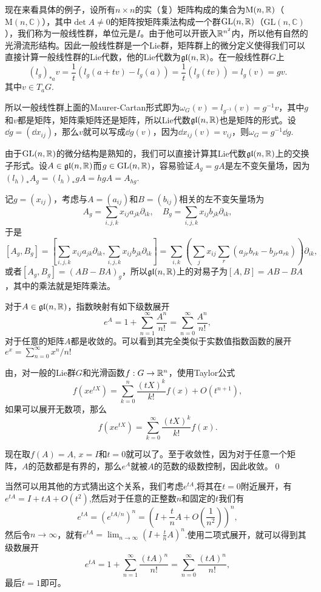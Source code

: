 \documentclass[9pt]{extarticle}
\newcommand{\cc}{\mathbb{C}}
\begin{document}
\para 现在来看具体的例子，设所有$n\times n$的实（复）矩阵构成的集合为$\mathrm{M}(n,\mathbb{R})$（$\mathrm{M}(n,\cc)$），其中$\det A\neq 0$的矩阵按矩阵乘法构成一个群$\mathrm{GL}(n,\mathbb{R})$（$\mathrm{GL}(n,\cc)$），我们称为一般线性群，单位元是$I$。由于他可以开嵌入$\mathbb{R}^{n^2}$内，所以他有自然的光滑流形结构。因此一般线性群是一个Lie群，矩阵群上的微分定义使得我们可以直接计算一般线性群的Lie代数，他的Lie代数为$\mathfrak{gl}(n,\mathbb{R})$。在一般线性群$G$上
\[
	(l_g)_{*a}v=\frac{1}{t}(l_g(a+tv)-l_g(a))
	=\frac{1}{t}(l_g(tv))=l_g(v)=gv.
\]
其中$v\in T_aG$.

所以一般线性群上面的Maurer-Cartan形式即为$\omega_G(v)=l_{g^{-1}}(v)=g^{-1}v$，其中$g$和$v$都是矩阵，矩阵乘矩阵还是矩阵，所以Lie代数$\mathfrak{gl}(n,\mathbb{R})$也是矩阵的形式。设$\dd g=(\dd x_{ij})$，那么$v$就可以写成$\dd g(v)$，因为$\dd x_{ij}(v)=v_{ij}$，则$\omega_G=g^{-1}\dd g$.

由于$\mathrm{GL}(n,\mathbb{R})$的微分结构是熟知的，我们可以直接计算其Lie代数$\mathfrak{gl}(n,\mathbb{R})$上的交换子形式。设$A\in\mathfrak{gl}(n,\mathbb{R})$而$g\in\mathrm{GL}(n,\mathbb{R})$，容易验证$A_g=gA$是左不变矢量场，因为$(l_h)_{*}A_g=(l_h)_{*}gA=hgA=A_{hg}$.

记$g=(x_{ij})$，考虑与$A=(a_{ij})$和$B=(b_{ij})$相关的左不变矢量场为
\[
A_g=\sum_{i,j,k}x_{ij}a_{jk}\partial_{ik},\quad B_g=\sum_{i,j,k}x_{ij}b_{jk}\partial_{ik},
\]
于是
\[
[A_g,B_g]=\left[\sum_{i,j,k}x_{ij}a_{jk}\partial_{ik},\sum_{i,j,k}x_{ij}b_{jk}\partial_{ik}\right]=\sum_{i,k}\left(\sum_{j}x_{ij}\sum_{r}(a_{jr}b_{rk}-b_{jr}a_{rk})\right)\partial_{ik},
\]
或者$[A_g,B_g]=(AB-BA)_g$，所以$\mathfrak{gl}(n,\mathbb{R})$上的对易子为$[A,B]=AB-BA$，其中的乘法就是矩阵乘法。

\para 对于$A\in\mathfrak{gl}(n,\mathbb{R})$，指数映射有如下级数展开
\[
	e^A=1+\sum_{n=1}^\infty \frac{A^n}{n!}=\sum_{n=0}^\infty \frac{A^n}{n!},
\]
对于任意的矩阵$A$都是收敛的。可以看到其完全类似于实数值指数函数的展开$e^x=\sum_{n=0}^\infty x^n/n!$

\proof 由，对一般的Lie群$G$和光滑函数$f:G\to \mathbb{R}^n$，使用Taylor公式
\[
	f(xe^{tX})=\sum_{k=0}^n\frac{(tX)^{k}}{k!}f(x)+O(t^{n+1}),
\]
如果可以展开无数项，那么
\[
	f(xe^{tX})=\sum_{k=0}^\infty\frac{(tX)^{k}}{k!}f(x).
\]

现在取$f(A)=A$, $x=I$和$t=0$就可以了。至于收敛性，因为对于任意一个矩阵，$A$的范数都是有界的，那么$e^A$就被$A$的范数的级数控制，因此收敛。\qed

当然可以用其他的方式猜出这个关系，我们考虑$e^{tA}$,将其在$t=0$附近展开，有$e^{tA}=I+tA+O(t^2)$,然后对于任意的正整数$n$和固定的$t$我们有
\[
	e^{tA}=\left(e^{tA/n}\right)^n=\left(I+\frac{t}{n}A+O\left(\frac{1}{n^2}\right)\right)^n,
\]
然后令$n\to\infty$，就有$e^{tA}=\lim_{n\to\infty}\left(I+\frac{t}{n}A\right)^n$.使用二项式展开，就可以得到其级数展开
\[
	e^{tA}=1+\sum_{n=1}^\infty \frac{(tA)^n}{n!}=\sum_{n=0}^\infty \frac{(tA)^n}{n!},
\]
最后$t=1$即可。
\end{document}
